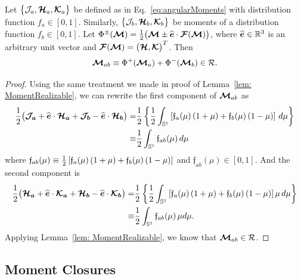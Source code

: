 \begin{lemma}
  Let $\big\{\mathcal{J}_{a},\boldsymbol{\mathcal{H}}_{a},\boldsymbol{\mathcal{K}}_{a}\big\}$ be defined as in Eq.~\eqref{eq:angularMoments} with distribution function $f_{a}\in[0,1]$.  
  Similarly, $\big\{\mathcal{J}_{b},\boldsymbol{\mathcal{H}}_{b},\boldsymbol{\mathcal{K}}_{b}\big\}$ be moments of a distribution function $f_{b}\in[0,1]$.  
  Let $\Phi^{\pm}(\boldsymbol{\mathcal{M}})=\frac{1}{2}\big(\boldsymbol{\mathcal{M}}\pm\widehat{\boldsymbol{e}}\cdot\boldsymbol{\mathcal{F}}(\boldsymbol{\mathcal{M}})\big)$, where $\widehat{\boldsymbol{e}}\in\mathbb{R}^{3}$ is an arbitrary unit vector and $\boldsymbol{\mathcal{F}}(\boldsymbol{\mathcal{M}})=\big(\boldsymbol{\mathcal{H}},\boldsymbol{\mathcal{K}}\big)^{T}$.  
  Then
  \begin{equation}
    \boldsymbol{\mathcal{M}}_{ab} \equiv \Phi^{+}(\boldsymbol{\mathcal{M}}_{a})+\Phi^{-}(\boldsymbol{\mathcal{M}}_{b})\in\mathcal{R}.
  \end{equation}
\end{lemma}
\begin{proof}
  Using the same treatment we made in proof of Lemma~\ref{lem: MomentRealizable}, we can rewrite the first component of $\boldsymbol{\mathcal{M}}_{ab}$ as
  \begin{align*}
  \frac{1}{2}\big(\boldsymbol{\mathcal{J}_{a}} + \widehat{\boldsymbol{e}}\cdot\boldsymbol{\mathcal{H}_{a}}+\boldsymbol{\mathcal{J}_{b}} - \widehat{\boldsymbol{e}}\cdot\boldsymbol{\mathcal{H}_{b}}\big) = &\frac{1}{2} \left\lbrace \frac{1}{2}\int_{\mathbb{S}^{1}}\left[ \mathfrak{f}_{a}(\mu)\,(1+\mu) + \mathfrak{f}_{b}(\mu)\,(1-\mu)\right] \,d\mu \right\rbrace \\
  \equiv  &\frac{1}{2}\int_{\mathbb{S}^{1}} \mathfrak{f}_{ab}(\mu)\,d\mu
  \end{align*}
  where $\mathfrak{f}_{ab}(\mu) \equiv \frac{1}{2}\left[ \mathfrak{f}_{a}(\mu)\,(1+\mu) + \mathfrak{f}_{b}(\mu)\,(1-\mu)\right]$ and $\mathfrak{f}_{ab}(\mu)\in[0,1]$.
  And the second component is
  \begin{align*} 
   \frac{1}{2}\big(\boldsymbol{\mathcal{H}_{a}} + \widehat{\boldsymbol{e}}\cdot\boldsymbol{\mathcal{K}_{a}}+\boldsymbol{\mathcal{H}_{b}} - \widehat{\boldsymbol{e}}\cdot\boldsymbol{\mathcal{K}_{b}}\big) =
   &\frac{1}{2} \left\lbrace \frac{1}{2}\int_{\mathbb{S}^{1}}\left[ \mathfrak{f}_{a}(\mu)\,(1+\mu) + \mathfrak{f}_{b}(\mu)\,(1-\mu)\right]\mu \,d\mu \right\rbrace \\
   \equiv  &\frac{1}{2}\int_{\mathbb{S}^{1}} \mathfrak{f}_{ab}(\mu)\,\mu d\mu. 
  \end{align*}
  Applying Lemma~\ref{lem: MomentRealizable}, we know that $\boldsymbol{\mathcal{M}}_{ab}\in\mathcal{R}$.
\end{proof}

\subsection{Moment Closures}

